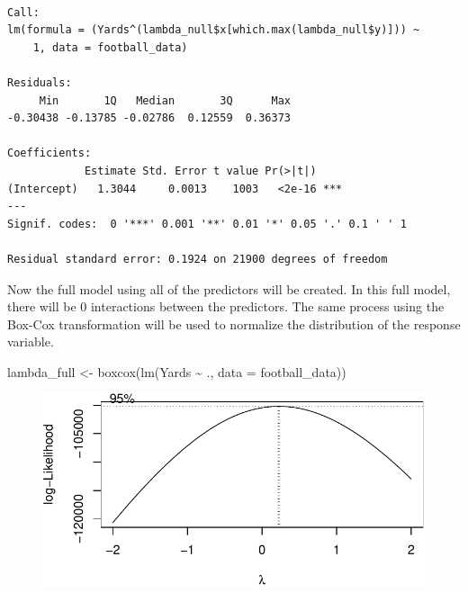 \documentclass[
  super,
  preprint,
  3p]{elsarticle}
\newenvironment{Shaded}{\begin{snugshade}}{\end{snugshade}}
\newcommand{\AttributeTok}[1]{\textcolor[rgb]{0.40,0.45,0.13}{#1}}
\newcommand{\DecValTok}[1]{\textcolor[rgb]{0.68,0.00,0.00}{#1}}
\newcommand{\FunctionTok}[1]{\textcolor[rgb]{0.28,0.35,0.67}{#1}}
\newcommand{\NormalTok}[1]{\textcolor[rgb]{0.00,0.23,0.31}{#1}}
\newcommand{\OtherTok}[1]{\textcolor[rgb]{0.00,0.23,0.31}{#1}}
\newcommand{\SpecialCharTok}[1]{\textcolor[rgb]{0.37,0.37,0.37}{#1}}
\begin{document}
\begin{Shaded}
\end{Shaded}

\begin{verbatim}

Call:
lm(formula = (Yards^(lambda_null$x[which.max(lambda_null$y)])) ~ 
    1, data = football_data)

Residuals:
     Min       1Q   Median       3Q      Max 
-0.30438 -0.13785 -0.02786  0.12559  0.36373 

Coefficients:
            Estimate Std. Error t value Pr(>|t|)    
(Intercept)   1.3044     0.0013    1003   <2e-16 ***
---
Signif. codes:  0 '***' 0.001 '**' 0.01 '*' 0.05 '.' 0.1 ' ' 1

Residual standard error: 0.1924 on 21900 degrees of freedom
\end{verbatim}

Now the full model using all of the predictors will be created. In this
full model, there will be 0 interactions between the predictors. The
same process using the Box-Cox transformation will be used to normalize
the distribution of the response variable.

\begin{Shaded}
\begin{Highlighting}[]
\NormalTok{lambda\_full }\OtherTok{\textless{}{-}} \FunctionTok{boxcox}\NormalTok{(}\FunctionTok{lm}\NormalTok{(Yards }\SpecialCharTok{\textasciitilde{}}\NormalTok{ ., }\AttributeTok{data =}\NormalTok{ football\_data))}
\end{Highlighting}
\end{Shaded}

\begin{figure}[H]

{\centering \includegraphics{project_report_files/figure-pdf/unnamed-chunk-23-1.pdf}

}

\end{figure}
\end{document}
